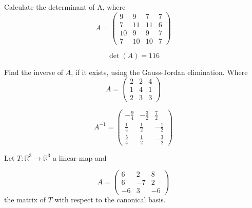 \begin{questions}

\question Calculate the determinant of A, where
$$
A=\left(\begin{array}{rrrr}
9 & 9 & 7 & 7 \\
7 & 11 & 11 & 6 \\
10 & 9 & 9 & 7 \\
7 & 10 & 10 & 7
\end{array}\right)
$$

\begin{solution}
$$\det(A)=116$$
\end{solution}

\question Find the inverse of $A$, if it exists, using the Gauss-Jordan elimination. Where
$$
A=\left(\begin{array}{rrr}
2 & 2 & 4 \\
1 & 4 & 1 \\
2 & 3 & 3
\end{array}\right)
$$

\begin{solution}
$$A^{-1}=\left(\begin{array}{rrr}
-\frac{9}{4} & -\frac{3}{2} & \frac{7}{2} \\
\frac{1}{4} & \frac{1}{2} & -\frac{1}{2} \\
\frac{5}{4} & \frac{1}{2} & -\frac{3}{2}
\end{array}\right)$$
\end{solution}

\question Let $T:\mathbb{R}^3\rightarrow\mathbb{R}^3$  a linear map and
 
$$
A=\left(\begin{array}{rrr}
6 & 2 & 8 \\
6 & -7 & 2 \\
-6 & 3 & -6
\end{array}\right)
$$
the matrix of $T$ with respect to the canonical basis.
\end{questions}
